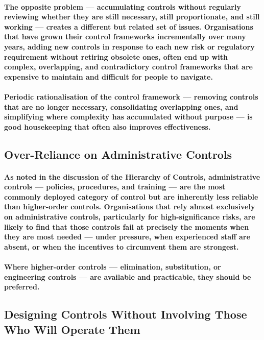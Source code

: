 \paragraph{The opposite problem — accumulating controls without regularly reviewing whether they are still necessary, still proportionate, and still working — creates a different but related set of issues. Organisations that have grown their control frameworks incrementally over many years, adding new controls in response to each new risk or regulatory requirement without retiring obsolete ones, often end up with complex, overlapping, and contradictory control frameworks that are expensive to maintain and difficult for people to navigate.}
\paragraph{Periodic rationalisation of the control framework — removing controls that are no longer necessary, consolidating overlapping ones, and simplifying where complexity has accumulated without purpose — is good housekeeping that often also improves effectiveness.}

\subsection{Over-Reliance on Administrative Controls}
\paragraph{As noted in the discussion of the Hierarchy of Controls, administrative controls — policies, procedures, and training — are the most commonly deployed category of control but are inherently less reliable than higher-order controls. Organisations that rely almost exclusively on administrative controls, particularly for high-significance risks, are likely to find that those controls fail at precisely the moments when they are most needed — under pressure, when experienced staff are absent, or when the incentives to circumvent them are strongest.}
\paragraph{Where higher-order controls — elimination, substitution, or engineering controls — are available and practicable, they should be preferred.}

\subsection{Designing Controls Without Involving Those Who Will Operate Them}
